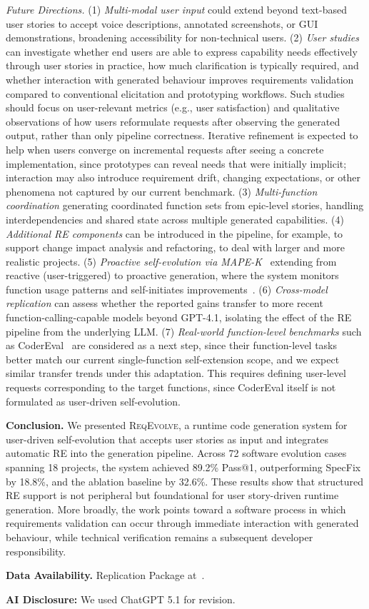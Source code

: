 \documentclass[sigconf,screen]{acmart}
\begin{document}
\textit{Future Directions.}
(1) \textit{Multi-modal user input} could extend beyond text-based user stories to accept voice descriptions, annotated screenshots, or GUI demonstrations, broadening accessibility for non-technical users. (2) \textit{User studies} can investigate whether end users are able to express capability needs effectively through user stories in practice, how much clarification is typically required, and whether interaction with generated behaviour improves requirements validation compared to conventional elicitation and prototyping workflows. Such studies should focus on user-relevant metrics (e.g., user satisfaction) and qualitative observations of how users reformulate requests after observing the generated output, rather than only pipeline correctness. Iterative refinement is expected to help when users converge on incremental requests after seeing a concrete implementation, since prototypes can reveal needs that were initially implicit; interaction may also introduce requirement drift, changing expectations, or other phenomena not captured by our current benchmark.
(3) \textit{Multi-function coordination} generating coordinated function sets from epic-level stories, handling interdependencies and shared state across multiple generated capabilities. (4) \textit{Additional RE components} can be introduced in the pipeline, for example, to support change impact analysis and refactoring, to deal with larger and more realistic projects. (5) \textit{Proactive self-evolution via MAPE-K}~\cite{mape-k} extending from reactive (user-triggered) to proactive generation, where the system monitors function usage patterns and self-initiates improvements~\cite{li2024genaisas}. (6) \textit{Cross-model replication} can assess whether the reported gains transfer to more recent function-calling-capable models beyond GPT-4.1, isolating the effect of the RE pipeline from the underlying LLM. (7) \textit{Real-world function-level benchmarks} such as CoderEval~\cite{yu2024codereval} are considered as a next step, since their function-level tasks better match our current single-function self-extension scope, and we expect similar transfer trends under this adaptation. This requires defining user-level requests corresponding to the target functions, since CoderEval itself is not formulated as user-driven self-evolution.

\textbf{Conclusion.} We presented \textsc{ReqEvolve}, a runtime code generation system for user-driven self-evolution that accepts user stories as input and integrates automatic RE into the generation pipeline. Across 72 software evolution cases spanning 18 projects, the system achieved 89.2\% Pass@1, outperforming SpecFix by 18.8\%, and the ablation baseline by 32.6\%. These results show that structured RE support is not peripheral but foundational for user story-driven runtime generation. More broadly, the work points toward a software process in which requirements validation can occur through immediate interaction with generated behaviour, while technical verification remains a subsequent developer responsibility.

\noindent
\textbf{Data Availability.} Replication Package at~\cite{fahim2026replication}.

\noindent
\textbf{AI Disclosure:} We used ChatGPT 5.1 for revision.



\end{document}
